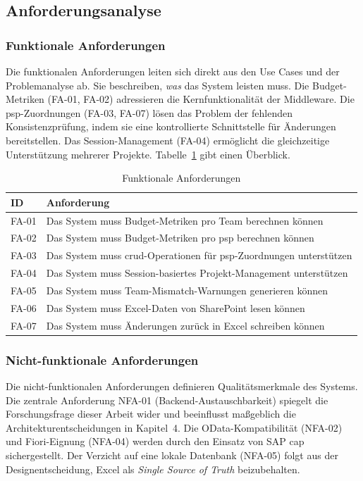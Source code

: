 \subsection{Anforderungsanalyse}

\subsubsection{Funktionale Anforderungen}

Die funktionalen Anforderungen leiten sich direkt aus den Use Cases und der Problemanalyse ab. Sie beschreiben, \textit{was} das System leisten muss. Die Budget-Metriken (FA-01, FA-02) adressieren die Kernfunktionalität der Middleware. Die \gls{psp}-Zuordnungen (FA-03, FA-07) lösen das Problem der fehlenden Konsistenzprüfung, indem sie eine kontrollierte Schnittstelle für Änderungen bereitstellen. Das Session-Management (FA-04) ermöglicht die gleichzeitige Unterstützung mehrerer Projekte. Tabelle~\ref{tab:fa} gibt einen Überblick.

\begin{table}[H]
\centering
\caption{Funktionale Anforderungen}
\label{tab:fa}
\begin{tabularx}{\textwidth}{l>{\raggedright\arraybackslash}X}
\toprule
\textbf{ID} & \textbf{Anforderung} \\
\midrule
FA-01 & Das System muss Budget-Metriken pro Team berechnen können \\
FA-02 & Das System muss Budget-Metriken pro \gls{psp} berechnen können \\
FA-03 & Das System muss \gls{crud}-Operationen für \gls{psp}-Zuordnungen unterstützen \\
FA-04 & Das System muss Session-basiertes Projekt-Management unterstützen \\
FA-05 & Das System muss Team-Mismatch-Warnungen generieren können \\
FA-06 & Das System muss Excel-Daten von SharePoint lesen können \\
FA-07 & Das System muss Änderungen zurück in Excel schreiben können \\
\bottomrule
\end{tabularx}
\end{table}

\subsubsection{Nicht-funktionale Anforderungen}

Die nicht-funktionalen Anforderungen definieren Qualitätsmerkmale des Systems. Die zentrale Anforderung NFA-01 (Backend-Austauschbarkeit) spiegelt die Forschungsfrage dieser Arbeit wider und beeinflusst maßgeblich die Architekturentscheidungen in Kapitel~4. Die OData-Kompatibilität (NFA-02) und Fiori-Eignung (NFA-04) werden durch den Einsatz von SAP \gls{cap} sichergestellt. Der Verzicht auf eine lokale Datenbank (NFA-05) folgt aus der Designentscheidung, Excel als \textit{Single Source of Truth} beizubehalten.

